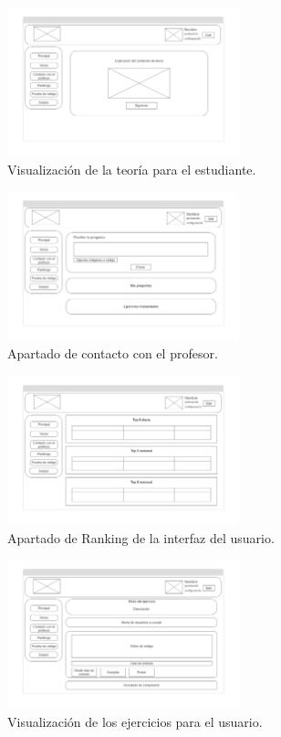 \begin{figure}[H]
    \centering
    \includegraphics[width=0.6\textwidth]{imagenes/Mockups/5-Teoria.png}
    \caption{Visualización de la teoría para el estudiante.}
\end{figure}

\begin{figure}[H]
    \centering
    \includegraphics[width=0.6\textwidth]{imagenes/Mockups/6-Consulta.png}
    \caption{Apartado de contacto con el profesor.}
\end{figure}

\begin{figure}[H]
    \centering
    \includegraphics[width=0.6\textwidth]{imagenes/Mockups/7-Ranking.png}
    \caption{Apartado de Ranking de la interfaz del usuario.}
\end{figure}


\begin{figure}[H]
    \centering
    \includegraphics[width=0.6\textwidth]{imagenes/Mockups/8-Ejercicio.png}
    \caption{Visualización de los ejercicios para el usuario.}
\end{figure}

